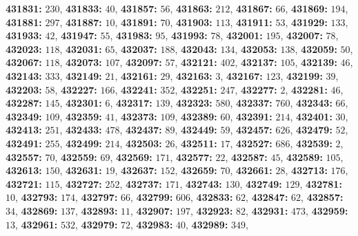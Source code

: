 \textsf{\bfseries 431831:} $230$, \textsf{\bfseries 431833:} $40$, \textsf{\bfseries 431857:} $56$, \textsf{\bfseries 431863:} $212$, \textsf{\bfseries 431867:} $66$, \textsf{\bfseries 431869:} $194$, \textsf{\bfseries 431881:} $297$, \textsf{\bfseries 431887:} $10$, \textsf{\bfseries 431891:} $70$, \textsf{\bfseries 431903:} $113$, \textsf{\bfseries 431911:} $53$, \textsf{\bfseries 431929:} $133$, \textsf{\bfseries 431933:} $42$, \textsf{\bfseries 431947:} $55$, \textsf{\bfseries 431983:} $95$, \textsf{\bfseries 431993:} $78$, \textsf{\bfseries 432001:} $195$, \textsf{\bfseries 432007:} $78$, \textsf{\bfseries 432023:} $118$, \textsf{\bfseries 432031:} $65$, \textsf{\bfseries 432037:} $188$, \textsf{\bfseries 432043:} $134$, \textsf{\bfseries 432053:} $138$, \textsf{\bfseries 432059:} $50$, \textsf{\bfseries 432067:} $118$, \textsf{\bfseries 432073:} $107$, \textsf{\bfseries 432097:} $57$, \textsf{\bfseries 432121:} $402$, \textsf{\bfseries 432137:} $105$, \textsf{\bfseries 432139:} $46$, \textsf{\bfseries 432143:} $333$, \textsf{\bfseries 432149:} $21$, \textsf{\bfseries 432161:} $29$, \textsf{\bfseries 432163:} $3$, \textsf{\bfseries 432167:} $123$, \textsf{\bfseries 432199:} $39$, \textsf{\bfseries 432203:} $58$, \textsf{\bfseries 432227:} $166$, \textsf{\bfseries 432241:} $352$, \textsf{\bfseries 432251:} $247$, \textsf{\bfseries 432277:} $2$, \textsf{\bfseries 432281:} $46$, \textsf{\bfseries 432287:} $145$, \textsf{\bfseries 432301:} $6$, \textsf{\bfseries 432317:} $139$, \textsf{\bfseries 432323:} $580$, \textsf{\bfseries 432337:} $760$, \textsf{\bfseries 432343:} $66$, \textsf{\bfseries 432349:} $109$, \textsf{\bfseries 432359:} $41$, \textsf{\bfseries 432373:} $109$, \textsf{\bfseries 432389:} $60$, \textsf{\bfseries 432391:} $214$, \textsf{\bfseries 432401:} $30$, \textsf{\bfseries 432413:} $251$, \textsf{\bfseries 432433:} $478$, \textsf{\bfseries 432437:} $89$, \textsf{\bfseries 432449:} $59$, \textsf{\bfseries 432457:} $626$, \textsf{\bfseries 432479:} $52$, \textsf{\bfseries 432491:} $255$, \textsf{\bfseries 432499:} $214$, \textsf{\bfseries 432503:} $26$, \textsf{\bfseries 432511:} $17$, \textsf{\bfseries 432527:} $686$, \textsf{\bfseries 432539:} $2$, \textsf{\bfseries 432557:} $70$, \textsf{\bfseries 432559:} $69$, \textsf{\bfseries 432569:} $171$, \textsf{\bfseries 432577:} $22$, \textsf{\bfseries 432587:} $45$, \textsf{\bfseries 432589:} $105$, \textsf{\bfseries 432613:} $150$, \textsf{\bfseries 432631:} $19$, \textsf{\bfseries 432637:} $152$, \textsf{\bfseries 432659:} $70$, \textsf{\bfseries 432661:} $28$, \textsf{\bfseries 432713:} $176$, \textsf{\bfseries 432721:} $115$, \textsf{\bfseries 432727:} $252$, \textsf{\bfseries 432737:} $171$, \textsf{\bfseries 432743:} $130$, \textsf{\bfseries 432749:} $129$, \textsf{\bfseries 432781:} $10$, \textsf{\bfseries 432793:} $174$, \textsf{\bfseries 432797:} $66$, \textsf{\bfseries 432799:} $606$, \textsf{\bfseries 432833:} $62$, \textsf{\bfseries 432847:} $62$, \textsf{\bfseries 432857:} $34$, \textsf{\bfseries 432869:} $137$, \textsf{\bfseries 432893:} $11$, \textsf{\bfseries 432907:} $197$, \textsf{\bfseries 432923:} $82$, \textsf{\bfseries 432931:} $473$, \textsf{\bfseries 432959:} $13$, \textsf{\bfseries 432961:} $532$, \textsf{\bfseries 432979:} $72$, \textsf{\bfseries 432983:} $40$, \textsf{\bfseries 432989:} $349$, 
